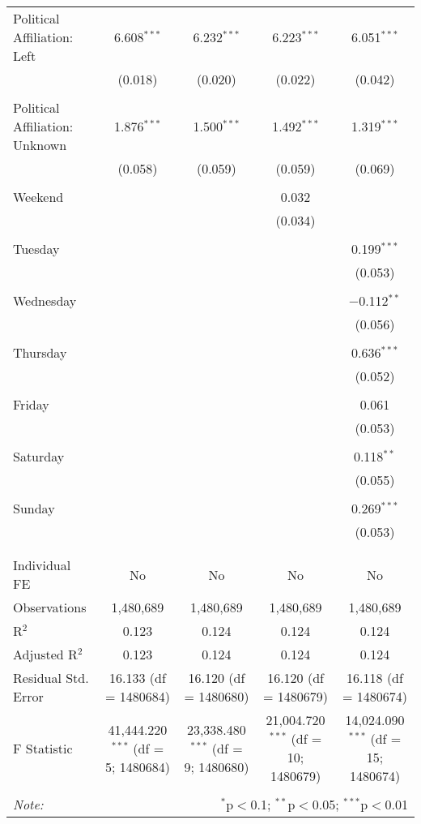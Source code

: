\documentclass[
]{article}
\begin{document}
\begin{table}[!htbp]
{\begin{tabular}{@{\extracolsep{5pt}}lcccc}
 Political Affiliation: Left & 6.608$^{***}$ & 6.232$^{***}$ & 6.223$^{***}$ & 6.051$^{***}$ \\ 
  & (0.018) & (0.020) & (0.022) & (0.042) \\ 
  & & & & \\ 
 Political Affiliation: Unknown & 1.876$^{***}$ & 1.500$^{***}$ & 1.492$^{***}$ & 1.319$^{***}$ \\ 
  & (0.058) & (0.059) & (0.059) & (0.069) \\ 
  & & & & \\ 
 Weekend &  &  & 0.032 &  \\ 
  &  &  & (0.034) &  \\ 
  & & & & \\ 
 Tuesday &  &  &  & 0.199$^{***}$ \\ 
  &  &  &  & (0.053) \\ 
  & & & & \\ 
 Wednesday &  &  &  & $-$0.112$^{**}$ \\ 
  &  &  &  & (0.056) \\ 
  & & & & \\ 
 Thursday &  &  &  & 0.636$^{***}$ \\ 
  &  &  &  & (0.052) \\ 
  & & & & \\ 
 Friday &  &  &  & 0.061 \\ 
  &  &  &  & (0.053) \\ 
  & & & & \\ 
 Saturday &  &  &  & 0.118$^{**}$ \\ 
  &  &  &  & (0.055) \\ 
  & & & & \\ 
 Sunday &  &  &  & 0.269$^{***}$ \\ 
  &  &  &  & (0.053) \\ 
  & & & & \\ 
\hline \\[-1.8ex] 
Individual FE & No & No & No & No \\ 
Observations & 1,480,689 & 1,480,689 & 1,480,689 & 1,480,689 \\ 
R$^{2}$ & 0.123 & 0.124 & 0.124 & 0.124 \\ 
Adjusted R$^{2}$ & 0.123 & 0.124 & 0.124 & 0.124 \\ 
Residual Std. Error & 16.133 (df = 1480684) & 16.120 (df = 1480680) & 16.120 (df = 1480679) & 16.118 (df = 1480674) \\ 
F Statistic & 41,444.220$^{***}$ (df = 5; 1480684) & 23,338.480$^{***}$ (df = 9; 1480680) & 21,004.720$^{***}$ (df = 10; 1480679) & 14,024.090$^{***}$ (df = 15; 1480674) \\ 
\hline 
\hline \\[-1.8ex] 
\textit{Note:}  & \multicolumn{4}{r}{$^{*}$p$<$0.1; $^{**}$p$<$0.05; $^{***}$p$<$0.01} \\ 
\end{tabular}
} 
\end{table} 
\newpage
\end{document}
